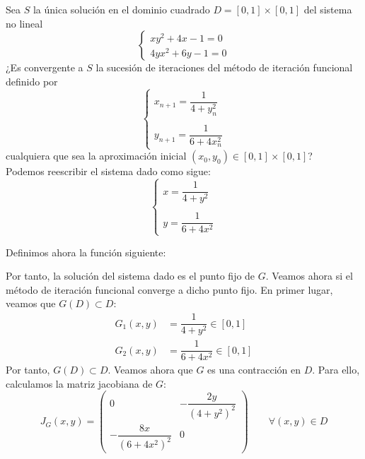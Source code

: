 \begin{ejercicio}
    Sea $S$ la única solución en el dominio cuadrado $D = [0, 1] \times [0, 1]$ del sistema no lineal
    \[
        \begin{cases}
            xy^2 + 4x - 1 = 0\\
            4yx^2 + 6y - 1 = 0
        \end{cases}
    \]
    ¿Es convergente a $S$ la sucesión de iteraciones del método de iteración funcional definido por
    \[
        \begin{cases}
            x_{n+1} = \dfrac{1}{4 + y_n^2}\\\\
            y_{n+1} = \dfrac{1}{6 + 4x_n^2}
        \end{cases}
    \]
    cualquiera que sea la aproximación inicial $(x_0, y_0) \in [0, 1] \times [0, 1]$?\\

    Podemos reescribir el sistema dado como sigue:
    \begin{equation*}
        \begin{cases}
            x = \dfrac{1}{4 + y^2}\\\\
            y = \dfrac{1}{6 + 4x^2}
        \end{cases}
    \end{equation*}

    Definimos ahora la función siguiente:

    Por tanto, la solución del sistema dado es el punto fijo de $G$. Veamos ahora si el método de iteración funcional converge a dicho punto fijo. En primer lugar, veamos que $G(D)\subset D$:
    \begin{align*}
        G_1(x, y) &= \dfrac{1}{4 + y^2}\in \left[0, 1\right]\\
        G_2(x, y) &= \dfrac{1}{6 + 4x^2}\in \left[0, 1\right]
    \end{align*}
    Por tanto, $G(D)\subset D$. Veamos ahora que $G$ es una contracción en $D$. Para ello, calculamos la matriz jacobiana de $G$:
    \begin{equation*}
        J_G(x, y) = \begin{pmatrix}
            0 & -\dfrac{2y}{(4 + y^2)^2}\\
            -\dfrac{8x}{(6 + 4x^2)^2} & 0
        \end{pmatrix}\qquad \forall (x, y)\in D
    \end{equation*}


\end{ejercicio}
